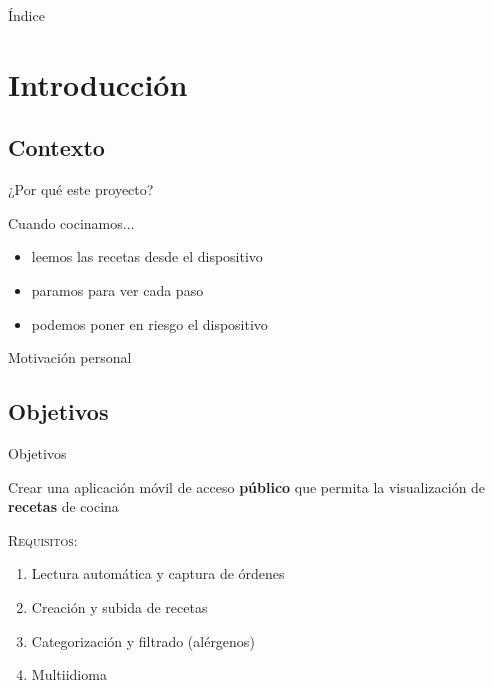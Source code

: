 \documentclass[10pt,xcolor=svgnames]{beamer}
\begin{document}
\everymath{\displaystyle}

\begin{frame}
  \maketitle
\end{frame}

\begin{frame}{Índice}
  \tableofcontents
\end{frame}

\section{Introducción}


\subsection{Contexto}

\begin{frame}{¿Por qué este proyecto?}
  \begin{block}{Cuando cocinamos...}
    \begin{itemize}
    \item leemos las recetas desde el dispositivo
    \item paramos para ver cada paso
    \item podemos poner en riesgo el dispositivo
    \end{itemize}
  \end{block}

  \begin{center}
    Motivación personal
  \end{center}
\end{frame}

\subsection{Objetivos}

\begin{frame}{Objetivos}
  \begin{center}
    Crear una aplicación móvil de acceso \textbf{público} que permita la
    visualización de \textbf{recetas} de cocina
  \end{center}

  \vspace*{0.5cm}

  \textsc{Requisitos:}\\
  \begin{enumerate}
  \item Lectura automática y captura de órdenes
  \item Creación y subida de recetas
  \item Categorización y filtrado (alérgenos)
  \item Multiidioma
  \end{enumerate}
\end{frame}
\end{document}
